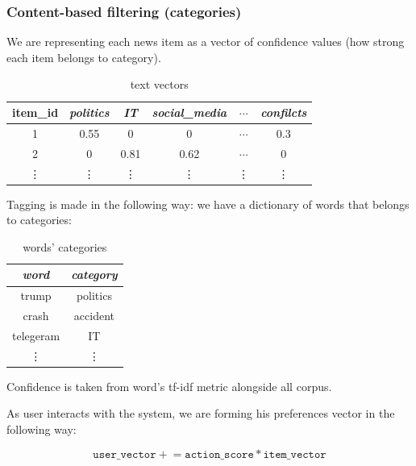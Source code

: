 \documentclass{article}
\begin{document}
\subsubsection{Content-based filtering (categories)}
\label{content}

We are representing each news item as a vector of confidence values (how strong each item belongs to category).

\begin{table}[h]
    \centering
    \begin{tabular}{cccccc}
        \toprule
        item\_id & \textit{politics} & \textit{IT} & \textit{social\_media} & $\cdots$ & \textit{confilcts} \\
        \midrule
        1 & 0.55 & 0 & 0 & $\cdots$ & 0.3 \\
        2 & 0    & 0.81  & 0.62 & $\cdots$ & 0 \\
        \vdots & \vdots & \vdots & \vdots & \vdots & \vdots\\

        \bottomrule
    \end{tabular}%
    \caption{text vectors}
    \label{tab:text_vectors}
\end{table}

Tagging is made in the following way: we have a dictionary of words that belongs to categories:

\begin{table}[h]
    \centering
    \begin{tabular}{cc}
        \toprule
        \textit{word} & \textit{category} \\
        \midrule
        trump & politics \\
        crash & accident \\
        telegeram & IT \\
        \vdots & \vdots \\
        \bottomrule
    \end{tabular}%
    \caption{words' categories}
    \label{tab:words_categories}
\end{table}

Confidence is taken from word's tf-idf metric alongside all corpus.

As user interacts with the system, we are forming his preferences vector in the following way:

\begin{equation}
    \texttt{user\_vector} \mathrel{+}= \texttt{action\_score} * \texttt{item\_vector}
\end{equation}
\end{document}
